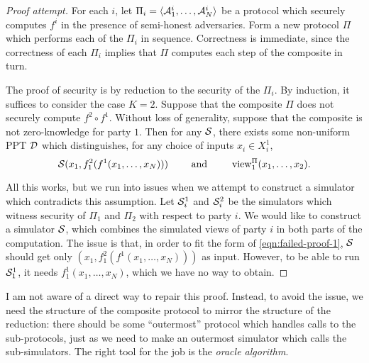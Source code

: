 \begin{proof}[Proof attempt]
  For each $i$, let $\Pi_i = \langle\mathcal{A}^i_1,\dots,\mathcal{A}^i_N\rangle$ be a protocol which
  securely computes $f^i$ in the presence of semi-honest adversaries. Form a new
  protocol $\Pi$ which performs each of the $\Pi_i$ in sequence. Correctness is
  immediate, since the correctness of each $\Pi_i$ implies that $\Pi$ computes
  each step of the composite in turn.

  The proof of security is by reduction to the security of the $\Pi_i$. By
  induction, it suffices to consider the case $K = 2$. Suppose that the
  composite $\Pi$ does not securely compute $f^2\circ f^1$. Without loss of
  generality, suppose that the composite is not zero-knowledge for party $1$.
  Then for any $\mathcal{S}$, there exists some non-uniform PPT $\mathcal{D}$ which
  distinguishes, for any choice of inputs $x_i\in X^1_i$,
  \begin{equation}\label{eqn:failed-proof-1}
    \mathcal{S}(x_1, f^2_1(f^1(x_1,\dots,x_N)))\quad\quad\text{ and }\quad\quad\operatorname{view}_1^{\Pi}(x_1,\dots,x_2).
  \end{equation}

  All this works, but we run into issues when we attempt to construct a
  simulator which contradicts this assumption. Let $\mathcal{S}^1_i$ and $\mathcal{S}^2_i$ be
  the simulators which witness security of $\Pi_1$ and $\Pi_2$ with respect to
  party $i$. We would like to construct a simulator $\mathcal{S}$, which combines the
  simulated views of party $i$ in both parts of the computation. The issue is
  that, in order to fit the form of \eqref{eqn:failed-proof-1},
  $\mathcal{S}$ should get only $(x_1, f^2_1(f^1(x_1, \dots, x_N)))$ as input. However,
  to be able to run $\mathcal{S}^1_1$, it needs $f^1_1(x_1, \dots, x_N)$, which we have
  no way to obtain.
  \renewcommand{\qedsymbol}{}
\end{proof}

I am not aware of a direct way to repair this proof. Instead, to avoid the
issue, we need the structure of the composite protocol to mirror the structure
of the reduction: there should be some ``outermost'' protocol which handles
calls to the sub-protocols, just as we need to make an outermost simulator which
calls the sub-simulators. The right tool for the job is the \emph{oracle
algorithm}.

